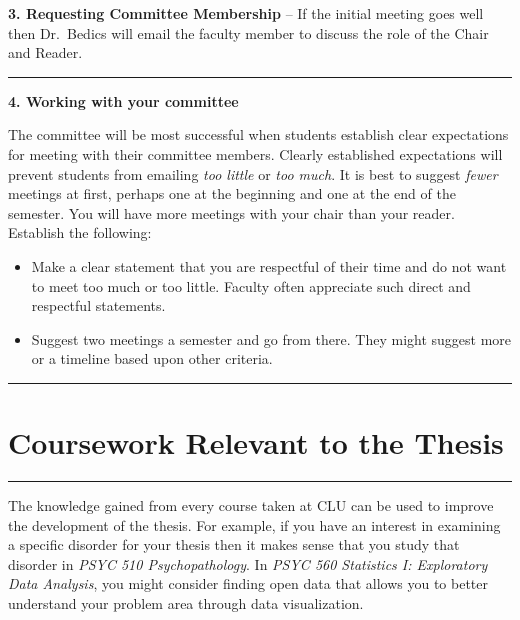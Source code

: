 \documentclass[openany]{book}
\begin{document}
\textbf{3. Requesting Committee Membership} -- If the initial meeting goes well then Dr.~Bedics will email the faculty member to discuss the role of the Chair and Reader.

\begin{center}\rule{0.5\linewidth}{0.5pt}\end{center}

\textbf{4. Working with your committee}

The committee will be most successful when students establish clear expectations for meeting with their committee members. Clearly established expectations will prevent students from emailing \emph{too little} or \emph{too much}. It is best to suggest \emph{fewer} meetings at first, perhaps one at the beginning and one at the end of the semester. You will have more meetings with your chair than your reader. Establish the following:

\begin{itemize}
\item
  Make a clear statement that you are respectful of their time and do not want to meet too much or too little. Faculty often appreciate such direct and respectful statements.
\item
  Suggest two meetings a semester and go from there. They might suggest more or a timeline based upon other criteria.
\end{itemize}

\begin{center}\rule{0.5\linewidth}{0.5pt}\end{center}

\hypertarget{coursework-relevant-to-the-thesis}{%
\chapter{Coursework Relevant to the Thesis}\label{coursework-relevant-to-the-thesis}}

\begin{center}\rule{0.5\linewidth}{0.5pt}\end{center}

The knowledge gained from every course taken at CLU can be used to improve the development of the thesis. For example, if you have an interest in examining a specific disorder for your thesis then it makes sense that you study that disorder in \emph{PSYC 510 Psychopathology}. In \emph{PSYC 560 Statistics I: Exploratory Data Analysis}, you might consider finding open data that allows you to better understand your problem area through data visualization.
\end{document}
